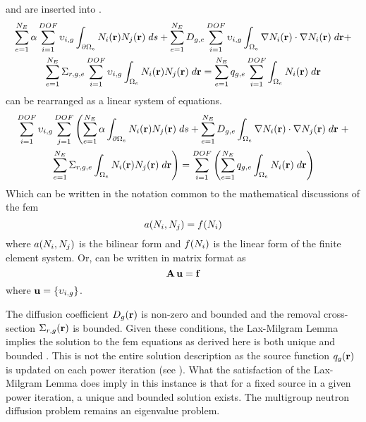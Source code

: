      and  are inserted 
    into .
    \begin{multline}
      \label{eq:this_above}
      \sum_{e=1}^{N_E} \alpha \sum_{i=1}^{DOF} \upsilon_{i,g}
        \int_{\partial \Omega_e}
        N_i(\mathbf{r})  N_j(\mathbf{r}) \;ds +
        \sum_{e=1}^{N_E} D_{g,e} \sum_{i=1}^{DOF} \upsilon_{i,g}
        \int_{\Omega_e} \mathbf{\nabla} N_i(\mathbf{r}) \cdot \mathbf{\nabla} N_i(\mathbf{r})\;d\mathbf{r}
        + \\
        \sum_{e=1}^{N_E} \Sigma_{r,g,e} \sum_{i=1}^{DOF} \upsilon_{i,g}
        \int_{\Omega_e} N_i(\mathbf{r}) N_j(\mathbf{r}) \; d\mathbf{r} =
        \sum_{e=1}^{N_E} q_{g,e} \sum_{i=1}^{DOF} 
        \int_{\Omega_e} N_i(\mathbf{r}) \; d\mathbf{r}
    \end{multline}
     can be rearranged as a linear system of equations.
    \begin{multline}
      \label{eq:linear_equation}
      \sum_{i=1}^{DOF} \upsilon_{i,g} \sum_{j=1}^{DOF} \left(
        \sum_{e=1}^{N_E} \alpha \int_{\partial \Omega_e}
        N_i(\mathbf{r})  N_j(\mathbf{r}) \;ds +
        \sum_{e=1}^{N_E} D_{g,e} 
        \int_{\Omega_e} \mathbf{\nabla} N_i(\mathbf{r}) \cdot \mathbf{\nabla} N_j(\mathbf{r})\;d\mathbf{r}
        \right.
        + \\
        \left.
        \sum_{e=1}^{N_E} \Sigma_{r,g,e}
        \int_{\Omega_e} N_i(\mathbf{r}) N_j(\mathbf{r}) \; d\mathbf{r} \right) =
        \sum_{i=1}^{DOF} \left(
        \sum_{e=1}^{N_E} q_{g,e} 
        \int_{\Omega_e} N_i(\mathbf{r}) \; d\mathbf{r} \right)
    \end{multline}
    Which can be written in the notation common to the mathematical discussions 
    of the \gls{fem}
    \begin{equation}
      \label{eq:fem_notation}
      a(N_i,N_j) = f(N_i)
    \end{equation}
    where $a(N_i,N_j)$ is the bilinear form and $f(N_i)$ is the 
    linear form of the finite element system.
    Or,  can be written in matrix format as
    \begin{equation}
      \label{eq:matrix_notation}
      \mathbf{A} \, \mathbf{u} = \mathbf{f}
    \end{equation}
    where $\mathbf{u} = \{\upsilon_{i,g}\}$. 
    
    The diffusion coefficient $D_g(\mathbf{r})$ is non-zero and bounded and
    the removal cross-section $\Sigma_{r,g}(\mathbf{r})$ is bounded. Given these
    conditions, the Lax-Milgram Lemma implies the solution to the \gls{fem}
    equations as derived here is both unique and bounded 
    \cite{textbookli}. This is not the entire solution description as the 
    source function $q_g(\mathbf{r})$ is updated on each power iteration (see 
    ). What the satisfaction of the Lax-Milgram Lemma
    does imply in this instance is that for a fixed source in a given power 
    iteration, a unique and bounded solution exists. The multigroup neutron 
    diffusion problem remains an eigenvalue problem.
    
